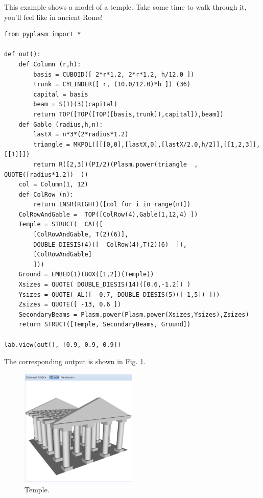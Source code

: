 \documentclass[article,A4,12pt]{llncs}
\begin{document}
This example shows a model of a temple. Take some 
time to walk through it, you'll feel like in ancient Rome!
{\small
\begin{verbatim}
from pyplasm import *

def out():
    def Column (r,h):
        basis = CUBOID([ 2*r*1.2, 2*r*1.2, h/12.0 ]) 
        trunk = CYLINDER([ r, (10.0/12.0)*h ]) (36)
        capital = basis
        beam = S(1)(3)(capital) 
        return TOP([TOP([TOP([basis,trunk]),capital]),beam])
    def Gable (radius,h,n): 
        lastX = n*3*(2*radius*1.2)
        triangle = MKPOL([[[0,0],[lastX,0],[lastX/2.0,h/2]],[[1,2,3]],[[1]]])
        return R([2,3])(PI/2)(Plasm.power(triangle  , QUOTE([radius*1.2])  ))
    col = Column(1, 12)
    def ColRow (n): 
        return INSR(RIGHT)([col for i in range(n)])
    ColRowAndGable =  TOP([ColRow(4),Gable(1,12,4) ])
    Temple = STRUCT(  CAT([
        [ColRowAndGable, T(2)(6)], 
        DOUBLE_DIESIS(4)([  ColRow(4),T(2)(6)  ]), 
        [ColRowAndGable] 
        ]))
    Ground = EMBED(1)(BOX([1,2])(Temple))
    Xsizes = QUOTE( DOUBLE_DIESIS(14)([0.6,-1.2]) )
    Ysizes = QUOTE( AL([ -0.7, DOUBLE_DIESIS(5)([-1,5]) ]))
    Zsizes = QUOTE([ -13, 0.6 ])
    SecondaryBeams = Plasm.power(Plasm.power(Xsizes,Ysizes),Zsizes)
    return STRUCT([Temple, SecondaryBeams, Ground])

lab.view(out(), [0.9, 0.9, 0.9])
\end{verbatim}
}
\noindent
The corresponding output is shown in Fig. \ref{fig:temple}.

\begin{figure}[!ht]
\begin{center}
\includegraphics[width=0.5\textwidth]{img/temple.png}
\end{center}
\vspace{-2mm}
\caption{Temple.}
\label{fig:temple}
\end{figure}
\noindent
\end{document}
